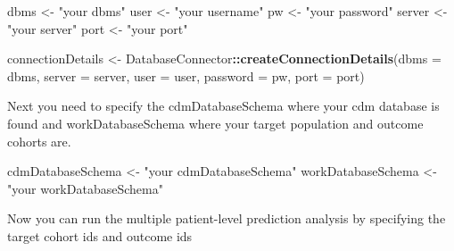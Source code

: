 \documentclass[]{article}
\newenvironment{Shaded}{\begin{snugshade}}{\end{snugshade}}
\newcommand{\KeywordTok}[1]{\textcolor[rgb]{0.13,0.29,0.53}{\textbf{#1}}}
\newcommand{\DataTypeTok}[1]{\textcolor[rgb]{0.13,0.29,0.53}{#1}}
\newcommand{\StringTok}[1]{\textcolor[rgb]{0.31,0.60,0.02}{#1}}
\newcommand{\OperatorTok}[1]{\textcolor[rgb]{0.81,0.36,0.00}{\textbf{#1}}}
\newcommand{\NormalTok}[1]{#1}
\begin{document}
\begin{Shaded}
\begin{Highlighting}[]
\NormalTok{dbms <-}\StringTok{ "your dbms"}
\NormalTok{user <-}\StringTok{ "your username"}
\NormalTok{pw <-}\StringTok{ "your password"}
\NormalTok{server <-}\StringTok{ "your server"}
\NormalTok{port <-}\StringTok{ "your port"}

\NormalTok{connectionDetails <-}\StringTok{ }\NormalTok{DatabaseConnector}\OperatorTok{::}\KeywordTok{createConnectionDetails}\NormalTok{(}\DataTypeTok{dbms =}\NormalTok{ dbms,}
                                                                \DataTypeTok{server =}\NormalTok{ server,}
                                                                \DataTypeTok{user =}\NormalTok{ user,}
                                                                \DataTypeTok{password =}\NormalTok{ pw,}
                                                                \DataTypeTok{port =}\NormalTok{ port)}
\end{Highlighting}
\end{Shaded}

Next you need to specify the cdmDatabaseSchema where your cdm database
is found and workDatabaseSchema where your target population and outcome
cohorts are.

\begin{Shaded}
\begin{Highlighting}[]
\NormalTok{cdmDatabaseSchema <-}\StringTok{ "your cdmDatabaseSchema"}
\NormalTok{workDatabaseSchema <-}\StringTok{ "your workDatabaseSchema"}
\end{Highlighting}
\end{Shaded}

Now you can run the multiple patient-level prediction analysis by
specifying the target cohort ids and outcome ids
\end{document}
